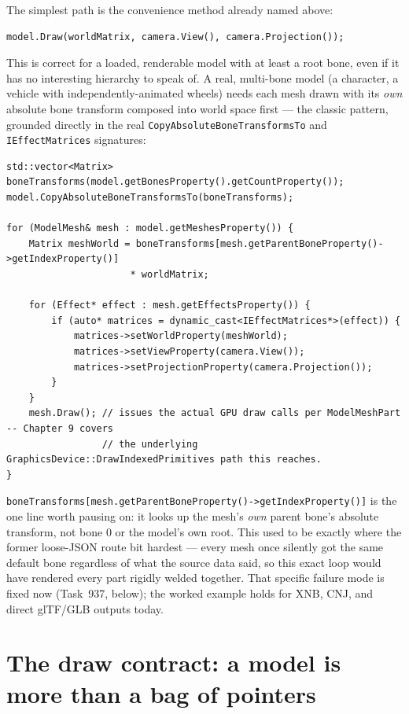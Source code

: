 The simplest path is the convenience method already named above:

\begin{lstlisting}
model.Draw(worldMatrix, camera.View(), camera.Projection());
\end{lstlisting}

This is correct for a loaded, renderable model with at least a root bone, even if it has no
interesting hierarchy to speak of. A real, multi-bone model
(a character, a vehicle with independently-animated wheels) needs each mesh drawn with its
\emph{own} absolute bone transform composed into world space first --- the classic pattern,
grounded directly in the real \texttt{CopyAbsoluteBoneTransformsTo} and
\texttt{IEffectMatrices} signatures:

\begin{lstlisting}
std::vector<Matrix> boneTransforms(model.getBonesProperty().getCountProperty());
model.CopyAbsoluteBoneTransformsTo(boneTransforms);

for (ModelMesh& mesh : model.getMeshesProperty()) {
    Matrix meshWorld = boneTransforms[mesh.getParentBoneProperty()->getIndexProperty()]
                      * worldMatrix;

    for (Effect* effect : mesh.getEffectsProperty()) {
        if (auto* matrices = dynamic_cast<IEffectMatrices*>(effect)) {
            matrices->setWorldProperty(meshWorld);
            matrices->setViewProperty(camera.View());
            matrices->setProjectionProperty(camera.Projection());
        }
    }
    mesh.Draw(); // issues the actual GPU draw calls per ModelMeshPart -- Chapter 9 covers
                 // the underlying GraphicsDevice::DrawIndexedPrimitives path this reaches.
}
\end{lstlisting}

\texttt{boneTransforms[mesh.getParentBoneProperty()->getIndexProperty()]} is the one line
worth pausing on: it looks up the mesh's \emph{own} parent bone's absolute transform, not bone
0 or the model's own root. This used to be exactly where the former loose-JSON route bit
hardest --- every mesh once silently got the same default bone regardless of what the source data
said, so this exact loop would have rendered every part rigidly welded together. That specific
failure mode is fixed now (Task~937, below); the worked example holds for XNB, CNJ, and direct
glTF/GLB outputs today.

\section{The draw contract: a model is more than a bag of pointers}
\label{sec:model-draw-contract}

